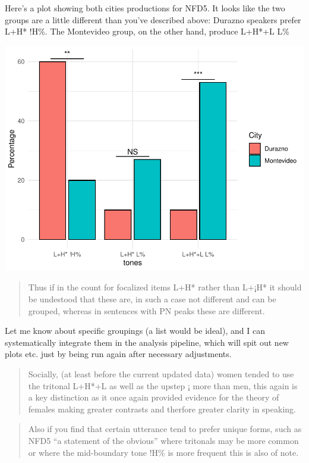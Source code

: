 \documentclass[
  man]{apa6}
\begin{document}
Here's a plot showing both cities productions for NFD5. It looks like the two groups are a little different than you've described above: Durazno speakers prefer L+H* !H\%.
The Montevideo group, on the other hand, produce L+H*+L L\%

\includegraphics{main_files/figure-latex/unnamed-chunk-9-1.pdf}

\begin{quote}
Thus if in the count for focalized items L+H* rather than L+¡H* it should be undestood that these are, in such a case not different and can be grouped, whereas in sentences with PN peaks these are different.
\end{quote}

Let me know about specific groupings (a list would be ideal), and I can systematically integrate them in the analysis pipeline, which will spit out new plots etc. just by being run again after necessary adjustments.

\begin{quote}
Socially, (at least before the current updated data) women tended to use the tritonal L+H*+L as well as the upstep ¡ more than men, this again is a key distinction as it once again provided evidence for the theory of females making greater contrasts and therfore greater clarity in speaking.
\end{quote}

\begin{quote}
Also if you find that certain utterance tend to prefer unique forms, such as NFD5 ``a statement of the obvious'' where tritonals may be more common or where the mid-boundary tone !H\% is more frequent this is also of note.
\end{quote}
\end{document}
